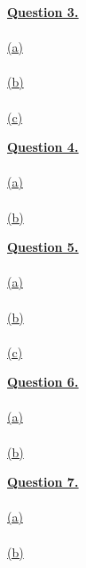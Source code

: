 \documentclass[12pt]{article}
\begin{document}
\hyperlink{toc}{\LARGE \underline{\textbf{Question 3.}}}\\
~\\\hyperlink{toc}{\hypertarget{3.1}{(a)}}\\
~\\\hyperlink{toc}{\hypertarget{3.2}{(b)}}\\
~\\\hyperlink{toc}{\hypertarget{3.3}{(c)}}\\
\newpage

\hyperlink{toc}{\LARGE \underline{\textbf{Question 4.}}}\\
~\\\hyperlink{toc}{\hypertarget{4.1}{(a)}}\\
~\\\hyperlink{toc}{\hypertarget{4.2}{(b)}}\\
\newpage

\hyperlink{toc}{\LARGE \underline{\textbf{Question 5.}}}\\
~\\\hyperlink{toc}{\hypertarget{5.1}{(a)}}\\
~\\\hyperlink{toc}{\hypertarget{5.2}{(b)}}\\
~\\\hyperlink{toc}{\hypertarget{5.3}{(c)}}\\
\newpage

\hyperlink{toc}{\LARGE \underline{\textbf{Question 6.}}}\\
~\\\hyperlink{toc}{\hypertarget{6.1}{(a)}}\\
~\\\hyperlink{toc}{\hypertarget{6.2}{(b)}}\\
\newpage

\hyperlink{toc}{\LARGE \underline{\textbf{Question 7.}}}\\
~\\\hyperlink{toc}{\hypertarget{7.1}{(a)}}\\
~\\\hyperlink{toc}{\hypertarget{7.2}{(b)}}\\
\end{document}
